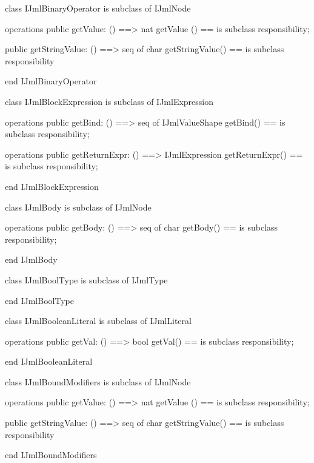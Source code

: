 \begin{vdm_al}
class IJmlBinaryOperator
 is subclass of IJmlNode

operations
  public getValue: () ==> nat
  getValue () == is subclass responsibility;

  public getStringValue: () ==> seq of char
  getStringValue() == is subclass responsibility

end IJmlBinaryOperator
\end{vdm_al}

\begin{vdm_al}
class IJmlBlockExpression
 is subclass of IJmlExpression

operations
  public getBind: () ==> seq of IJmlValueShape
  getBind() == is subclass responsibility;

operations
  public getReturnExpr: () ==> IJmlExpression
  getReturnExpr() == is subclass responsibility;

end IJmlBlockExpression
\end{vdm_al}

\begin{vdm_al}
class IJmlBody
 is subclass of IJmlNode

operations
  public getBody: () ==> seq of char
  getBody() == is subclass responsibility;

end IJmlBody
\end{vdm_al}

\begin{vdm_al}
class IJmlBoolType
 is subclass of IJmlType

end IJmlBoolType
\end{vdm_al}

\begin{vdm_al}
class IJmlBooleanLiteral
 is subclass of IJmlLiteral

operations
  public getVal: () ==> bool
  getVal() == is subclass responsibility;

end IJmlBooleanLiteral
\end{vdm_al}

\begin{vdm_al}
class IJmlBoundModifiers
 is subclass of IJmlNode

operations
  public getValue: () ==> nat
  getValue () == is subclass responsibility;

  public getStringValue: () ==> seq of char
  getStringValue() == is subclass responsibility

end IJmlBoundModifiers
\end{vdm_al}

